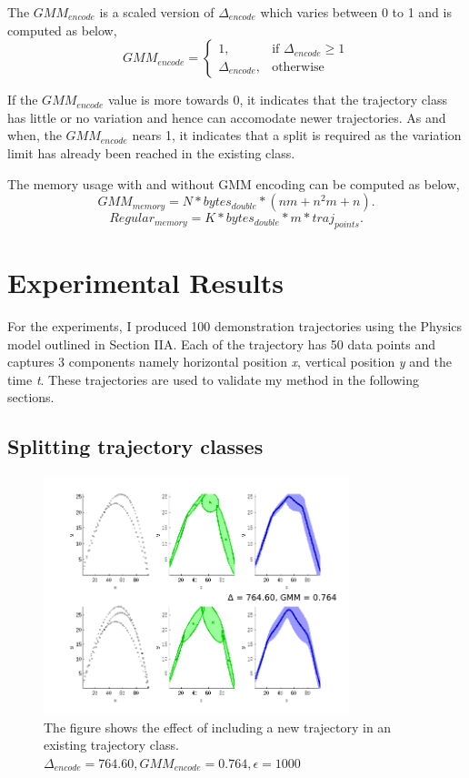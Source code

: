 \documentclass[conference]{IEEEtran}
\begin{document}
The $GMM_{encode}$ is a scaled version of $\Delta_{encode}$ which varies between 0 to 1 and is computed as below,
\[
    \text{$GMM_{encode}$}= 
\begin{cases}
    1, & \text{if $\Delta_{encode}$} \geq 1\\
    \text{$\Delta_{encode}$}, & \text{otherwise}
\end{cases}
\]

If the $GMM_{encode}$ value is more towards 0, it indicates that the trajectory class has little or no variation and hence can accomodate newer trajectories. As and when, the $GMM_{encode}$ nears 1, it indicates that a split is required as the variation limit has already been reached in the existing class.

The memory usage with and without GMM encoding can be computed as below,
\begin{equation}
GMM_{memory} = N * bytes_{double} * ( nm + n^{2}m + n ).
\end{equation}
\begin{equation}
Regular_{memory} = K * bytes_{double} * m * traj_{points}.
\end{equation}

\section{Experimental Results}
For the experiments, I produced 100 demonstration trajectories using the Physics model outlined in Section IIA. Each of the trajectory has 50 data points and captures 3 components namely horizontal position \emph{x}, vertical position \emph{y} and the time \emph{t}. These trajectories are used to validate my method in the following sections.

\subsection{Splitting trajectory classes}
\begin{figure}[!t]
\centering
\includegraphics[width=3.5in]{fig4}
\caption{The figure shows the effect of including a new trajectory in an existing trajectory class. $\Delta_{encode} = 764.60, GMM_{encode} = 0.764, \epsilon=1000$}
\label{fig:fig4}
\end{figure}
\end{document}

